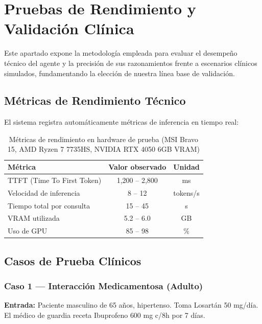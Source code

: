 \documentclass[12pt,a4paper]{article}
\begin{document}
\newpage

\section{Pruebas de Rendimiento y Validación Clínica}

Este apartado expone la metodología empleada para evaluar el desempeño técnico del agente y la precisión de sus razonamientos frente a escenarios clínicos simulados, fundamentando la elección de nuestra línea base de validación.

\subsection{Métricas de Rendimiento Técnico}

El sistema registra automáticamente métricas de inferencia en tiempo real:

\begin{table}[H]
  \centering
  \caption{Métricas de rendimiento en hardware de prueba (MSI Bravo 15, AMD Ryzen 7 7735HS, NVIDIA RTX 4050 6GB VRAM)}
  \begin{tabular}{lcc}
    \toprule
    \textbf{Métrica} & \textbf{Valor observado} & \textbf{Unidad} \\
    \midrule
    TTFT (Time To First Token) & 1,200 -- 2,800 & ms \\
    Velocidad de inferencia & 8 -- 12 & tokens/s \\
    Tiempo total por consulta & 15 -- 45 & s \\
    VRAM utilizada & 5.2 -- 6.0 & GB \\
    Uso de GPU & 85 -- 98 & \% \\
    \bottomrule
  \end{tabular}
\end{table}

\subsection{Casos de Prueba Clínicos}

\subsubsection{Caso 1 --- Interacción Medicamentosa (Adulto)}
\textbf{Entrada:} Paciente masculino de 65 años, hipertenso. Toma Losartán 50 mg/día.
El médico de guardia receta Ibuprofeno 600 mg c/8h por 7 días.
\end{document}
